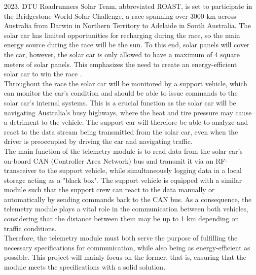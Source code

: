 \documentclass[conference]{IEEEtran}
\begin{document}
 2023, DTU Roadrunners Solar Team, abbreviated ROAST, is set to participate in the Bridgestone World Solar Challenge, a race spanning over 3000 km across Australia from Darwin in Northern Territory to Adelaide in South Australia. The solar car has limited opportunities for recharging during the race, so the main energy source during the race will be the sun. To this end, solar panels will cover the car, however, the solar car is only allowed to have a maximum of 4 square meters of solar panels. This emphasizes the need to create an energy-efficient solar car to win the race \cite{wsc}.\\
Throughout the race the solar car will be monitored by a support vehicle, which can monitor the car's condition and should be able to issue commands to the solar car's internal systems. This is a crucial function as the solar car will be navigating Australia's busy highways, where the heat and tire pressure may cause a detriment to the vehicle. The support car will therefore be able to analyze and react to the data stream being transmitted from the solar car, even when the driver is preoccupied by driving the car and navigating traffic. \\
The main function of the telemetry module is to read data from the solar car's on-board CAN (Controller Area Network) bus and transmit it via an RF-transceiver to the support vehicle, while simultaneously logging data in a local storage acting as a "black box". The support vehicle is equipped with a similar module such that the support crew can react to the data manually or automatically by sending commands back to the CAN bus. As a consequence, the telemetry module plays a vital role in the communication between both vehicles, considering that the distance between them may be up to 1 km depending on traffic conditions.\\
Therefore, the telemetry module must both serve the purpose of fulfilling the necessary specifications for communication, while also being as energy-efficient as possible. This project will mainly focus on the former, that is, ensuring that the module meets the specifications with a solid solution.
\end{document}
